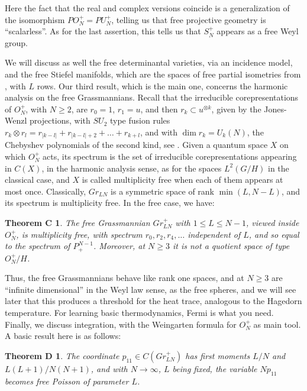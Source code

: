 \documentclass[11pt]{article}
\theoremstyle{plain}
\newtheorem*{theoremC}{Theorem C}
\newtheorem*{theoremD}{Theorem D}
\begin{document}
Here the fact that the real and complex versions coincide is a generalization of the isomorphism $PO_N^+=PU_N^+$, telling us that free projective geometry is ``scalarless''. As for the last assertion, this tells us that $S_N^+$ appears as a free Weyl group.

\bigskip

We will discuss as well the free determinantal varieties, via an incidence model, and the free Stiefel manifolds, which are the spaces of free partial isometries from \cite{ba1}, with $L$ rows. Our third result, which is the main one, concerns the harmonic analysis on the free Grassmannians. Recall that the irreducible corepresentations of $O_N^+$, with $N\geq2$, are $r_0=1$, $r_1=u$, and then $r_k\subset u^{\otimes k}$, given by the Jones-Wenzl projections, with $SU_2$ type fusion rules $r_k\otimes r_l=r_{|k-l|}+r_{|k-l|+2}+\ldots+r_{k+l}$, and with $\dim r_k=U_k(N)$, the Chebyshev polynomials of the second kind, see \cite{ba1}. Given a quantum space $X$ on which $O_N^+$ acts, its spectrum is the set of irreducible corepresentations appearing in $C(X)$, in the harmonic analysis sense, as for the spaces $L^2(G/H)$ in the classical case, and $X$ is called multiplicity free when each of them appears at most once. Classically, $Gr_{LN}$ is a symmetric space of rank $\min(L,N-L)$, and its spectrum is multiplicity free. In the free case, we have:

\begin{theoremC}
The free Grassmannian $Gr^+_{LN}$ with $1\leq L\leq N-1$, viewed inside $O_N^+$, is multiplicity free, with spectrum $r_0,r_2,r_4,\ldots$ independent of $L$, and so equal to the spectrum of $P^{N-1}_+$. Moreover, at $N\geq3$ it is not a quotient space of type $O_N^+/H$.
\end{theoremC}

Thus, the free Grassmannians behave like rank one spaces, and at $N\geq3$ are ``infinite dimensional'' in the Weyl law sense, as the free spheres, and we will see later that this produces a threshold for the heat trace, analogous to the Hagedorn temperature. For learning basic thermodynamics, Fermi \cite{fth} is what you need. Finally, we discuss integration, with the Weingarten formula for $O_N^+$ as main tool. A basic result here is as follows:

\begin{theoremD}
The coordinate $p_{11}\in C(Gr^+_{LN})$ has first moments $L/N$ and $L(L+1)/N(N+1)$, and with $N\to\infty$, $L$ being fixed, the variable $Np_{11}$ becomes free Poisson of parameter $L$.
\end{theoremD}
\end{document}
